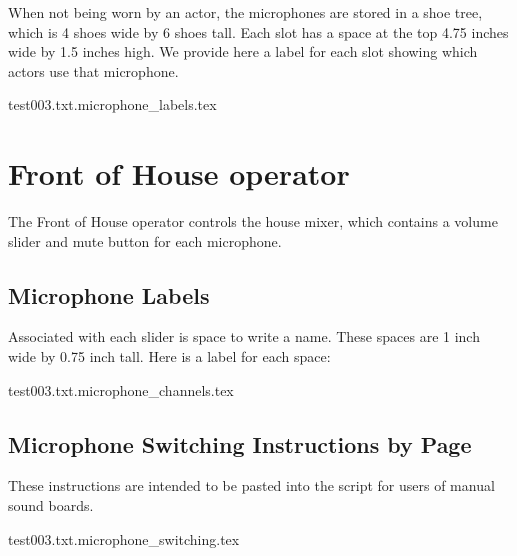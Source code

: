 \documentclass[letterpaper]{article}
\begin{document}
When not being worn by an actor, the microphones are stored in a shoe tree,
which is 4 shoes wide by 6 shoes tall.  
Each slot has a space at the top 4.75 inches wide
by 1.5 inches high.  We provide here a label for each slot showing which
actors use that microphone.

{\Large
 {test003.txt.microphone_labels.tex}
}

\section {Front of House operator}

The Front of House operator controls the house mixer, 
which contains a volume slider
and mute button for each microphone.  

\subsection {Microphone Labels}

Associated with each slider is space to write a name.  
These spaces are 1 inch wide by 0.75 inch tall.  
Here is a label for each space:

{\Large
 {test003.txt.microphone_channels.tex}
}

\subsection {Microphone Switching Instructions by Page}

These instructions are intended to be pasted into the script
for users of manual sound boards.

 {test003.txt.microphone_switching.tex}
\end{document}
